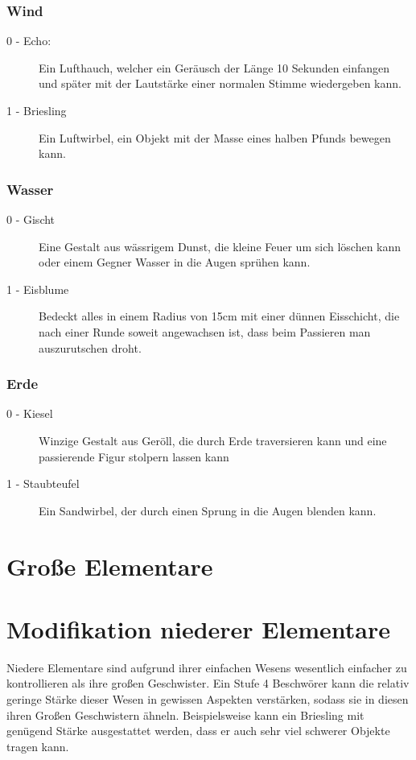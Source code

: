 \documentclass[a4paper,12pt,oneside]{book}
\begin{document}
\subsection{Wind}
\begin{description}
\item[0 - Echo:]Ein Lufthauch, welcher ein Geräusch der Länge 10 Sekunden einfangen und später mit der Lautstärke einer normalen Stimme wiedergeben kann.
\item[1 - Briesling]Ein Luftwirbel, ein Objekt mit der Masse eines halben Pfunds bewegen kann.
\end{description}
\subsection{Wasser}
\begin{description} 
\item[0 - Gischt]Eine Gestalt aus wässrigem Dunst, die kleine Feuer um sich löschen kann oder einem Gegner Wasser in die Augen sprühen kann.
\item[1 - Eisblume]Bedeckt alles in einem Radius von 15cm mit einer dünnen Eisschicht, die nach einer Runde soweit angewachsen ist, dass beim Passieren man auszurutschen droht.
\end{description}
\subsection{Erde}
\begin{description} 
\item[0 - Kiesel]Winzige Gestalt aus Geröll, die durch Erde traversieren kann und eine passierende Figur stolpern lassen kann 
\item[1 - Staubteufel]Ein Sandwirbel, der durch einen Sprung in die Augen blenden kann.
\end{description}


\chapter{Große Elementare}

\chapter{Modifikation niederer Elementare}
Niedere Elementare sind aufgrund ihrer einfachen Wesens wesentlich einfacher zu kontrollieren als ihre großen Geschwister. Ein Stufe 4 Beschwörer kann die relativ geringe Stärke dieser Wesen in gewissen Aspekten verstärken, sodass sie in diesen ihren Großen Geschwistern ähneln. Beispielsweise kann ein Briesling mit genügend Stärke ausgestattet werden, dass er auch sehr viel schwerer Objekte tragen kann.
\end{document}
